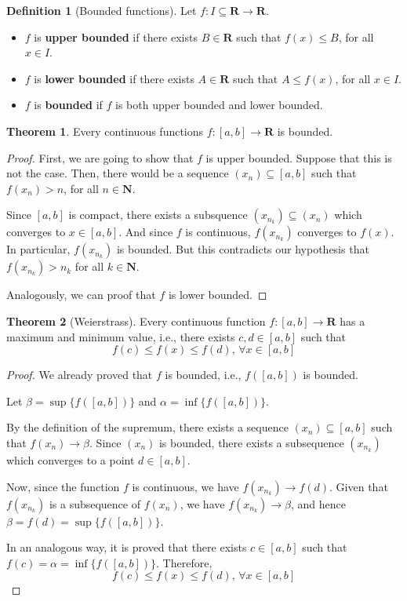 \documentclass[tikz,12pt,a4paper]{article}
\theoremstyle{definition}
\newtheorem{theorem}{Theorem}[section]
\newtheorem{definition}{Definition}[section]
\begin{document}
\begin{definition}[Bounded functions]
	Let $f : I \subseteq \textbf{R} \longrightarrow \textbf{R}$.
	\begin{itemize}
		\item $f$ is \textbf{upper bounded} if there exists $B \in \textbf{R}$ such that $f(x) \leq B$, for all $x \in I$.
		\item $f$ is \textbf{lower bounded} if there exists $A \in \textbf{R}$ such that $A \leq f(x)$, for all $x \in I$.
		\item $f$ is \textbf{bounded} if $f$ is both upper bounded and lower bounded.
	\end{itemize}
\end{definition}

\begin{theorem}
	Every continuous functions $f : [a,b] \longrightarrow \textbf{R}$ is bounded.
\end{theorem}

\begin{proof}
	First, we are going to show that $f$ is upper bounded. Suppose that this is not the case. Then, there would be a sequence $(x_n) \subseteq [a,b]$ such that $f(x_n) > n$, for all $n \in \textbf{N}$.
	
	Since $[a,b]$ is compact, there exists a subsquence $(x_{n_k}) \subseteq (x_n)$ which converges to $x \in [a,b]$. And since $f$ is continuous, $f(x_{n_k})$ converges to $f(x)$. In particular, $f(x_{n_k})$ is bounded. But this contradicts our hypothesis that $f(x_{n_k}) > n_k$ for all $k \in \textbf{N}$.
	
	Analogously, we can proof that $f$ is lower bounded.
\end{proof}

\begin{theorem}[Weierstrass]\label{thm:weierstrass}
	Every continuous function $f : [a,b] \longrightarrow \textbf{R}$ has a maximum and minimum value, i.e., there exists $c, d \in [a,b]$ such that
	\[
		f(c) \leq f(x) \leq f(d) , \, \forall x \in [a,b]
	\]
\end{theorem}

\begin{proof}
	We already proved that $f$ is bounded, i.e., $f([a,b])$ is bounded. 
	
	Let $\beta = \sup \{ f([a,b]) \}$ and $\alpha = \inf \{ f([a,b]) \}$.
	
	By the definition of the supremum, there exists a sequence $(x_n) \subseteq [a,b]$ such that $f(x_n) \longrightarrow \beta$. Since $(x_n)$ is bounded, there exists a subsequence $(x_{n_k})$ which converges to a point $d \in [a,b]$.
	
	Now, since the function $f$ is continuous, we have $f(x_{n_k}) \longrightarrow f(d)$. Given that $f(x_{n_k})$ is a  subsequence of $f(x_n)$, we have $f(x_{n_k}) \longrightarrow \beta$, and hence $\beta = f(d) = \sup \{ f([a,b]) \}$.
	
	In an analogous way, it is proved that there exists $c \in [a,b]$ such that $f(c) = \alpha = \inf \{ f([a,b]) \}$. Therefore,
	\[
		f(c) \leq f(x) \leq f(d) , \, \forall x \in [a,b]
	\]
\end{proof}
\end{document}
